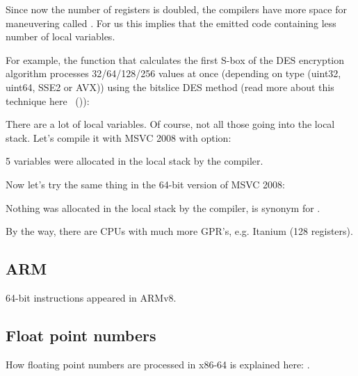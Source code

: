 
Since now the number of registers is doubled, the compilers have more space for maneuvering called 
.
For us this implies that the emitted code containing less number of local variables.


For example, the function that calculates the first S-box of the DES encryption algorithm processes
32/64/128/256 values at once (depending on  type (uint32, uint64, SSE2 or AVX)) 
using the bitslice DES method
(read more about this technique here ~()):



There are a lot of local variables. 
Of course, not all those going into the local stack.
Let's compile it with MSVC 2008 with  option:



5 variables were allocated in the local stack by the compiler.

Now let's try the same thing in the 64-bit version of MSVC 2008:



Nothing was allocated in the local stack by the compiler,  is synonym for .

\iffalse

By the way, we can see here that the function saved the \RCX and \RDX registers in space allocated by the \gls{caller},
but \Reg{8} and \Reg{9} were not saved but used from the beginning.
\fi

By the way, there are CPUs with much more \ac{GPR}'s, e.g. Itanium (128 registers).

\subsection{ARM}

64-bit instructions appeared in ARMv8.

\subsection{Float point numbers}

How floating point numbers are processed in x86-64 is explained here: .

